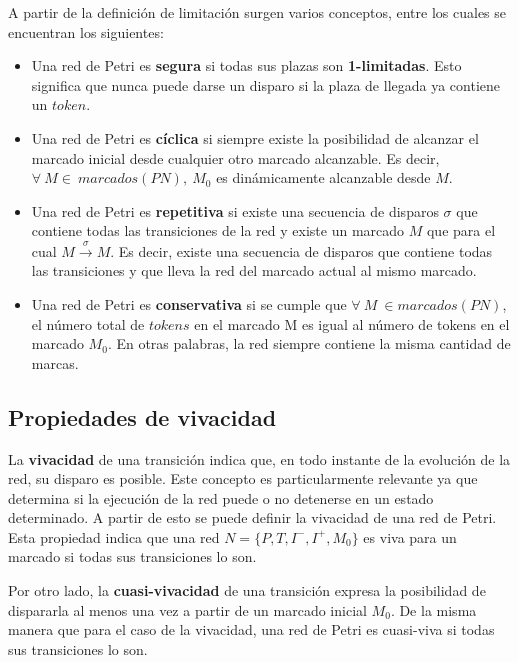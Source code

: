 A partir de la definición de limitación surgen varios conceptos, entre los cuales se encuentran los siguientes:
\begin{itemize}
    \item Una red de Petri es \textbf{segura} si todas sus plazas son \textbf{1-limitadas}. Esto significa que nunca puede darse un disparo si la plaza de llegada ya contiene un $token$.
    
    \item Una red de Petri es \textbf{cíclica} si siempre existe la posibilidad de alcanzar el marcado inicial desde cualquier otro marcado alcanzable. Es decir, \break $\forall \ M  \in \ marcados(PN),\ M_0$ es dinámicamente alcanzable desde $M$.
    
    \item Una red de Petri es \textbf{repetitiva} si existe una secuencia de disparos $\sigma$ que contiene todas las transiciones de la red y existe un marcado $M$ que para el cual $M \xrightarrow{\sigma} M$. Es decir, existe una secuencia de disparos que contiene todas las transiciones y que lleva la red del marcado actual al mismo marcado.
    
    \item  Una red de Petri es \textbf{conservativa} si se cumple que $\forall \ M\ \in marcados (PN)$, el número total de $tokens$ en el marcado M es igual al número de tokens en el marcado $M_0$. En otras palabras, la red siempre contiene la misma cantidad de marcas.
    
\end{itemize}

\subsection{Propiedades de vivacidad}
La \textbf{vivacidad} de una transición indica que, en todo instante de la  evolución de la red, su disparo es posible. Este concepto es particularmente relevante ya que determina si la ejecución de la red puede  o no detenerse en un estado determinado. A partir de esto se puede definir la vivacidad de una red de Petri. Esta propiedad indica que una red $N = \{P, T, I^- , I^+ , M_0 \}$ es viva para un marcado si todas sus transiciones lo son.

Por otro lado, la \textbf{cuasi-vivacidad} de una transición expresa la posibilidad de dispararla al menos una vez a partir de un marcado inicial $M_0$. De la misma manera que para el caso de la vivacidad, una red de Petri es cuasi-viva si todas sus transiciones lo son.

